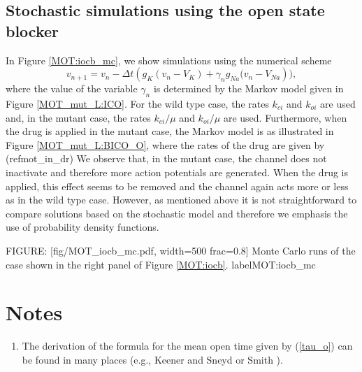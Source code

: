 \subsection{Stochastic simulations using the open state blocker}

In Figure \ref{MOT:iocb_mc}, we show simulations using the numerical scheme
\begin{equation}
v_{n+1}=v_{n}-\Delta t\left(  g_{K}\left(  v_{n}-V_{K}\right)  +\gamma
_{n}g_{Na}(v_{n}-V_{Na}\right)  ), \label{s1000}
\end{equation}
where the value of the variable $\gamma_{n}$ 
is determined by the Markov model given in
Figure \ref{MOT_mut_L:ICO}. For the wild type case, the rates $k_{ci}$ and $k_{oi}$
are used and, in the mutant case, the rates $k_{ci}/\mu$ and $k_{oi}
/\mu$ are used. Furthermore, when the drug is applied in the mutant case, the Markov
model is as illustrated in Figure \ref{MOT_mut_L:BICO_O}, where the rates of
the drug are given by (ref{mot_in_dr}) We observe that, in the
mutant case, the channel does not inactivate and therefore more action
potentials are generated. When the drug is applied, this effect seems to be removed and
the channel again acts more or less as in the wild type case. However, as mentioned above
it is not straightforward to compare solutions based on the stochastic model and therefore we emphasis
the use of probability density functions. 

FIGURE: [fig/MOT_iocb_mc.pdf, width=500 frac=0.8] Monte Carlo runs of the case shown in the right panel of Figure \ref{MOT:iocb}. label{MOT:iocb_mc}\section{Notes}

\begin{enumerate}
\item The derivation of the formula for the mean open time given by (\ref{tau_o}) can be found in many
places (e.g., Keener and Sneyd \cite{KeenerSneyd} or Smith \cite{Smith2002}). 
\end{enumerate}


